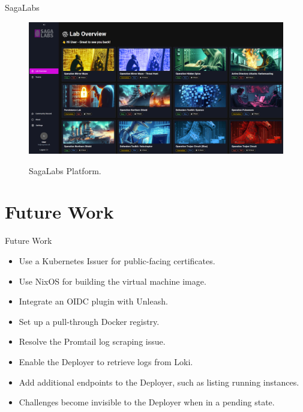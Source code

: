 \documentclass{beamer}
\begin{document}
\begin{frame}{SagaLabs}
    \begin{figure}
        \centering
        \href{https://sagalabs.dk/}{%
            \includegraphics[width=1\textwidth]{./images/SagaLabs.png}
        }
        \caption{SagaLabs Platform.}
    \end{figure}
\end{frame}

\section{Future Work}
\begin{frame}{Future Work}
    \begin{itemize}
        \item Use a Kubernetes Issuer for public-facing certificates.
        \item Use NixOS for building the virtual machine image.
        \item Integrate an OIDC plugin with Unleash.
        \item Set up a pull-through Docker registry.
        \item Resolve the Promtail log scraping issue.
        \item Enable the Deployer to retrieve logs from Loki.
        \item Add additional endpoints to the Deployer, such as listing running instances.
        \item Challenges become invisible to the Deployer when in a pending state.
    \end{itemize}
\end{frame}
\end{document}
